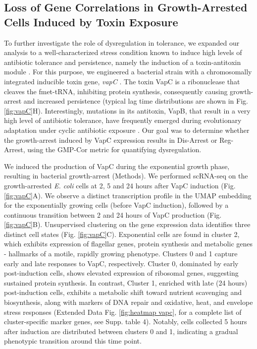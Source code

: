 \documentclass[12pt]{article}
\begin{document}
\subsection{Loss of Gene Correlations in Growth-Arrested Cells Induced by Toxin Exposure}
To further investigate the role of dysregulation in tolerance, we expanded our analysis to a well-characterized stress condition known to induce high levels of antibiotic tolerance and persistence, namely the induction of a toxin-antitoxin module \cite{Moyed1983}. For this purpose, we engineered a bacterial strain with a chromosomally integrated inducible toxin gene, \textit{vapC} \cite{Ronine2025}.
The toxin VapC is a ribonuclease that cleaves the fmet-tRNA, inhibiting protein synthesis, consequently causing growth-arrest and increased persistence \cite{Rotem2010,Gerdes2012,Hall2017,Harms2018} (typical lag time distributions are shown in Fig. \ref{fig:vapC}H). Interestingly, mutations in its antitoxin, VapB, that result in a very high level of antibiotic tolerance, have frequently emerged during evolutionary adaptation under cyclic antibiotic exposure \cite{Levin-Reisman2017, Fridman2014}. Our goal was to determine whether the growth-arrest induced by VapC expression results in Dis-Arrest or Reg-Arrest, using the GMP-Cor metric for quantifying dysregulation.  \par
We induced the production of VapC during the exponential growth phase, resulting in bacterial growth-arrest (Methods). We performed scRNA-seq on the growth-arrested \textit{E. coli} cells at 2, 5 and 24 hours after VapC induction (Fig. \ref{fig:vapC}A). We observe a distinct transcription profile in the UMAP embedding for the exponentially growing cells (before VapC induction), followed by a continuous transition between 2 and 24 hours of VapC production (Fig. \ref{fig:vapC}B). Unsupervised clustering on the gene expression data identifies three distinct cell states (Fig. \ref{fig:vapC}C). Exponential cells are found in cluster 2, which exhibits expression of flagellar genes, protein synthesis and metabolic genes - hallmarks of a motile, rapidly growing phenotype. Clusters 0 and 1 capture early and late responses to VapC, respectively. Cluster 0, dominated by early post-induction cells, shows elevated expression of ribosomal genes, suggesting sustained protein synthesis. In contrast, Cluster 1, enriched with late (24 hours) post-induction cells, exhibits a metabolic shift toward nutrient scavenging and biosynthesis, along with markers of DNA repair and oxidative, heat, and envelope stress responses (Extended Data Fig. \ref{fig:heatmap vapc}, for a complete list of cluster-specific marker genes, see Supp. table 4). Notably, cells collected 5 hours after induction are distributed between clusters 0 and 1, indicating a gradual phenotypic transition around this time point.\par
\end{document}
